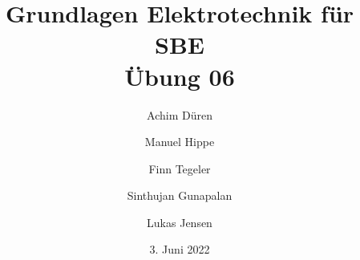 \documentclass[../../document.tex]{subfiles}
\begin{document}
\title{Grundlagen Elektrotechnik für SBE\\Übung 06}

\author{
  Achim Düren\\
  \and
  Manuel Hippe\\
  \and
  Finn Tegeler\\
  \and
  Sinthujan Gunapalan\\
  \and
  Lukas Jensen\\
}
\date{3. Juni 2022}

\maketitle
\end{document}
